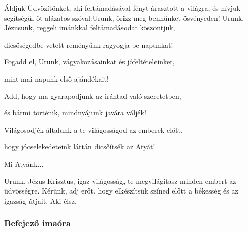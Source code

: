 \documentclass[twoside]{article}
\begin{document}






\begin{preces}{Áldjuk Üdvözítőnket, aki feltámadásával fényt árasztott a világra, és hívjuk
    segítségül őt alázatos szóval:}{Urunk, őrizz meg bennünket ösvényeden!}
  Urunk, Jézusunk, reggeli imánkkal feltámadásodat köszöntjük,

  \reddash dicsőségedbe vetett reményünk ragyogja be napunkat!

  Fogadd el, Urunk, vágyakozásainkat és jófeltételeinket,

  \reddash mint mai napunk első ajándékait!

  Add, hogy ma gyarapodjunk az irántad való szeretetben,

  \reddash és bármi történik, mindnyájunk javára váljék!

  Világosodjék általunk a te világosságod az emberek előtt,

  \reddash hogy jócselekedeteink láttán dicsőítsék az Atyát!
\end{preces}
Mi Atyánk...


Urunk, Jézus Krisztus, igaz világosság, te megvilágítasz minden embert az üdvösségre. Kérünk, adj
erőt, hogy elkészítsük színed előtt a békesség és az igazság útjait. Aki élsz.

\label{f3/Compl}

\subsubsection*{Befejező imaóra}



\end{document}
